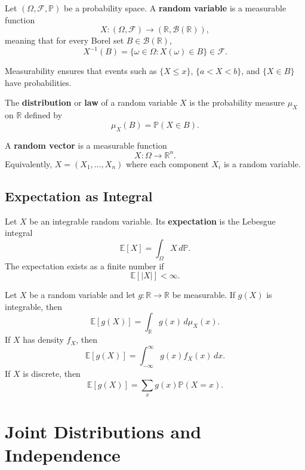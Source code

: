 \begin{definition}
Let $(\Omega,\mathcal{F},\mathbb{P})$ be a probability space. A \textbf{random variable} is a measurable function
\[
    X:(\Omega,\mathcal{F})\to(\mathbb{R},\mathcal{B}(\mathbb{R})),
\]
meaning that for every Borel set $B\in\mathcal{B}(\mathbb{R})$,
\[
    X^{-1}(B)=\{\omega\in\Omega:X(\omega)\in B\}\in\mathcal{F}.
\]
\end{definition}

\begin{remark}
Measurability ensures that events such as $\{X\leq x\}$, $\{a<X<b\}$, and $\{X\in B\}$ have probabilities.
\end{remark}

\begin{definition}[Distribution]
The \textbf{distribution} or \textbf{law} of a random variable $X$ is the probability measure $\mu_X$ on $\mathbb{R}$ defined by
\[
    \mu_X(B)=\mathbb{P}(X\in B).
\]
\end{definition}

\begin{definition}
A \textbf{random vector} is a measurable function
\[
    X:\Omega\to\mathbb{R}^n.
\]
Equivalently, $X=(X_1,\dots,X_n)$ where each component $X_i$ is a random variable.
\end{definition}

\subsection{Expectation as Integral}

\begin{definition}[Expectation]
Let $X$ be an integrable random variable. Its \textbf{expectation} is the Lebesgue integral
\[
    \mathbb{E}[X]=\int_\Omega X\,d\mathbb{P}.
\]
The expectation exists as a finite number if
\[
    \mathbb{E}[|X|]<\infty.
\]
\end{definition}

\begin{theorem}
Let $X$ be a random variable and let $g:\mathbb{R}\to\mathbb{R}$ be measurable. If $g(X)$ is integrable, then
\[
    \mathbb{E}[g(X)]=\int_{\mathbb{R}}g(x)\,d\mu_X(x).
\]
If $X$ has density $f_X$, then
\[
    \mathbb{E}[g(X)]=\int_{-\infty}^{\infty}g(x)f_X(x)\,dx.
\]
If $X$ is discrete, then
\[
    \mathbb{E}[g(X)]=\sum_x g(x)\mathbb{P}(X=x).
\]
\end{theorem}

\section{Joint Distributions and Independence}


